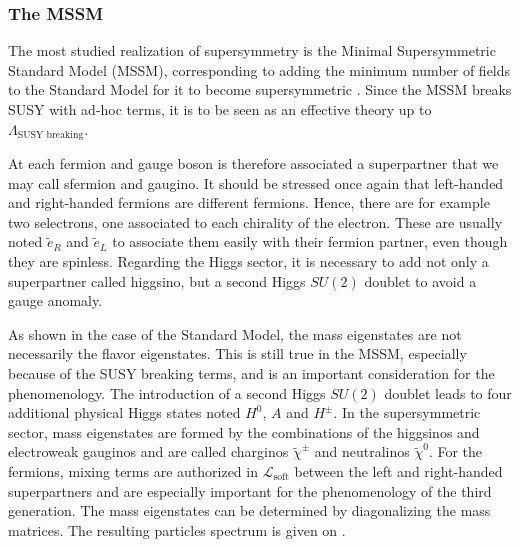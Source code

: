         \subsubsection{The MSSM}

        The most studied realization of supersymmetry is the Minimal Supersymmetric Standard
        Model (MSSM), corresponding to adding the minimum number of fields to the Standard
        Model for it to become supersymmetric \cite{Dawson, Vempati, Romao}.
        Since the MSSM breaks SUSY with ad-hoc terms, it is to be seen as an effective
        theory up to $\Lambda_{\text{SUSY breaking}}$.

        At each fermion and gauge boson is therefore associated a superpartner that we may
        call sfermion and gaugino. It should be
        stressed once again that left-handed and right-handed fermions are different
        fermions. Hence, there are for example two selectrons, one associated to
        each chirality of the electron. These are usually noted $\tilde{e}_R$ and $\tilde{e}_L$
        to associate them easily with their fermion partner, even though they are spinless.
        Regarding the Higgs sector, it is necessary to add not only a superpartner called
        higgsino, but a second Higgs $SU(2)$ doublet to avoid a gauge anomaly.

        As shown in the case of the Standard Model, the mass eigenstates are not
        necessarily the flavor eigenstates. This is still true in the MSSM, especially
        because of the SUSY breaking terms, and is an important consideration for the
        phenomenology. The introduction of a second Higgs $SU(2)$ doublet leads to four
        additional physical Higgs states noted $H^0$, $A$ and $H^\pm$.
        In the supersymmetric sector, mass eigenstates are formed by the combinations of
        the higgsinos and electroweak gauginos and are called charginos $\tilde{\chi}^\pm$
        and neutralinos $\tilde{\chi}^0$.
        For the fermions, mixing terms are authorized in $\mathcal{L}_\text{soft}$ between
        the left and right-handed superpartners and are especially important for the
        phenomenology of the third generation. The mass eigenstates can be determined
        by diagonalizing the mass matrices. The resulting particles spectrum is given on
        .

